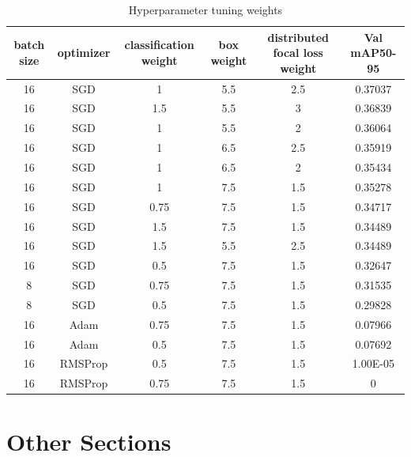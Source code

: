 \documentclass[10pt,twocolumn,letterpaper]{article}
\begin{document}
\begin{table}
    \begin{center}
    \begin{tabular}{|c|ccccc|}
        \hline
        batch size & optimizer & classification weight & box weight & distributed focal loss weight & Val mAP50-95 \\
        \hline
        16 & SGD & 1 & 5.5 & 2.5 & 0.37037 \\
        16 & SGD & 1.5 & 5.5 & 3 & 0.36839 \\
        16 & SGD & 1 & 5.5 & 2 & 0.36064 \\
        16 & SGD & 1 & 6.5 & 2.5 & 0.35919 \\
        16 & SGD & 1 & 6.5 & 2 & 0.35434 \\
        16 & SGD & 1 & 7.5 & 1.5 & 0.35278 \\
        16 & SGD & 0.75 & 7.5 & 1.5 & 0.34717 \\
        16 & SGD & 1.5 & 7.5 & 1.5 & 0.34489 \\
        16 & SGD & 1.5 & 5.5 & 2.5 & 0.34489 \\
        16 & SGD & 0.5 & 7.5 & 1.5 & 0.32647 \\
        8 & SGD & 0.75 & 7.5 & 1.5 & 0.31535 \\
        8 & SGD & 0.5 & 7.5 & 1.5 & 0.29828 \\
        16 & Adam & 0.75 & 7.5 & 1.5 & 0.07966 \\
        16 & Adam & 0.5 & 7.5 & 1.5 & 0.07692 \\
        16 & RMSProp & 0.5 & 7.5 & 1.5 & 1.00E-05 \\
        16 & RMSProp & 0.75 & 7.5 & 1.5 & 0 \\
        \hline
    \end{tabular}
    \end{center}
    \caption{Hyperparameter tuning weights}
    \label{tab:Hyper_param_tune_2}
\end{table}

\section{Other Sections}
\end{document}
